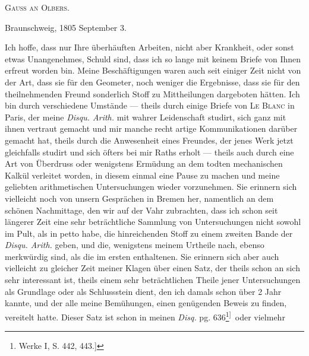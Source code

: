 \begin{center}\textsc{Gauss an Olbers.}\end{center}
\begin{flushright}Braunschweig, 1805 September 3.\end{flushright}
\par\indent Ich hoffe, dass nur Ihre überhäuften Arbeiten, nicht aber Krankheit, oder sonst etwas Unangenehmes, Schuld sind, dass ich so lange mit keinem Briefe von Ihnen erfreut worden bin. Meine Beschäftigungen waren auch seit einiger Zeit nicht von der Art, dass sie für den Geometer, noch weniger die Ergebnisse, dass sie für den theilnehmenden Freund sonderlich Stoff zu Mittheilungen dargeboten hätten. Ich bin durch verschiedene Umstände — theils durch einige Briefe von \textsc{Le Blanc} in Paris, der meine \textit{Disqu. Arith.} mit wahrer Leidenschaft studirt, sich ganz mit ihnen vertraut gemacht und mir manche recht artige Kommunikationen darüber gemacht hat, theils durch die Anwesenheit eines Freundes, der jenes Werk jetzt gleichfalls studirt und sich öfters bei mir Raths erholt — theils auch durch eine Art von Überdruss oder wenigstens Ermüdung an dem todten mechanischen Kalkül verleitet worden, in diesem einmal eine Pause zu machen und meine geliebten arithmetischen Untersuchungen wieder vorzunehmen. Sie erinnern sich vielleicht noch von unsern Gesprächen in Bremen her, namentlich an dem schönen Nachmittage, den wir auf der Vahr zubrachten, dass ich schon seit längerer Zeit eine sehr beträchtliche Sammlung von Untersuchungen nicht sowohl im Pult, als in petto habe, die hinreichenden Stoff zu einem zweiten Bande der \textit{Disqu. Arith.} geben, und die, wenigstens meinem Urtheile nach, ebenso merkwürdig sind, als die im ersten enthaltenen. Sie erinnern sich aber auch vielleicht zu gleicher Zeit meiner Klagen über einen Satz, der theils schon an sich sehr interessant ist, theils einem sehr beträchtlichen Theile jener Untersuchungen als Grundlage oder als Schlussstein dient, den ich damals schon über 2 Jahr kannte, und der alle meine Bemühungen, einen genügenden Beweis zu finden, vereitelt hatte. Dieser Satz ist schon in meinen \textit{Disq.} pg. 636\begingroup\renewcommand{\thefootnote}{[*)}\footnote{Werke I, S. 442, 443.]}\textsuperscript{]}\endgroup\ oder vielmehr
\clearpage
{}
